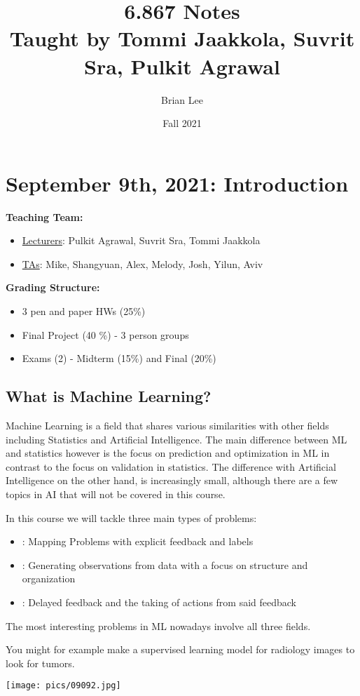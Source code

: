 \documentclass[11pt]{scrartcl}
\title{\Large 6.867 Notes\\ 
\large Taught by Tommi Jaakkola, Suvrit Sra, Pulkit Agrawal}
\subtitle{}
\author{\small Brian Lee}
\date{\small Fall 2021}
\begin{document}
\section{September 9th, 2021: Introduction}
\textbf{Teaching Team:}
\begin{itemize}
    \item \underline{Lecturers}: Pulkit Agrawal, Suvrit Sra, Tommi Jaakkola
    \item \underline{TAs}: Mike, Shangyuan, Alex, Melody, Josh, Yilun, Aviv
\end{itemize}

\textbf{Grading Structure:}
\begin{itemize}
    \item 3 pen and paper HWs (25\%)
    \item Final Project (40 \%) - 3 person groups
    \item Exams (2) - Midterm (15\%) and Final (20\%)
\end{itemize}

\subsection{What is Machine Learning?}
Machine Learning is a field that shares various similarities with other fields including Statistics and Artificial Intelligence. The main difference between ML and statistics however is the focus on prediction and optimization in ML in contrast to the focus on validation in statistics. The difference with Artificial Intelligence on the other hand, is increasingly small, although there are a few topics in AI that will not be covered in this course. 

In this course we will tackle three main types of problems:
\begin{itemize}
    \item {}: Mapping Problems with explicit feedback and labels
    \item {}: Generating observations from data with a focus on structure and organization
    \item {}: Delayed feedback and the taking of actions from said feedback
\end{itemize}
The most interesting problems in ML nowadays involve all three fields. 
\begin{ex}
You might for example make a supervised learning model for radiology images to look for tumors. 
\begin{center}
\texttt{[image: pics/09092.jpg]}
\end{center}
\end{ex}
\end{document}
